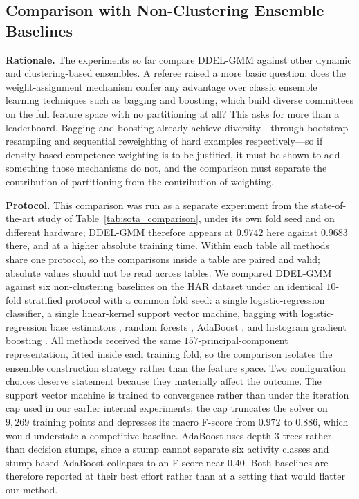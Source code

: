 \documentclass[lettersize,journal]{IEEEtran}
\begin{document}
		\subsection{Comparison with Non-Clustering Ensemble Baselines}
		
		\noindent \textbf{Rationale.} The experiments so far compare DDEL-GMM against other dynamic and clustering-based ensembles. A referee raised a more basic question: does the weight-assignment mechanism confer any advantage over classic ensemble learning techniques such as bagging and boosting, which build diverse committees on the full feature space with no partitioning at all? This asks for more than a leaderboard. Bagging and boosting already achieve diversity---through bootstrap resampling and sequential reweighting of hard examples respectively---so if density-based competence weighting is to be justified, it must be shown to add something those mechanisms do not, and the comparison must separate the contribution of partitioning from the contribution of weighting.
		
		\noindent \textbf{Protocol.} This comparison was run as a separate experiment from the state-of-the-art study of Table~\ref{tab:sota_comparison}, under its own fold seed and on different hardware; DDEL-GMM therefore appears at $0.9742$ here against $0.9683$ there, and at a higher absolute training time. Within each table all methods share one protocol, so the comparisons inside a table are paired and valid; absolute values should not be read across tables. We compared DDEL-GMM against six non-clustering baselines on the HAR dataset under an identical $10$-fold stratified protocol with a common fold seed: a single logistic-regression classifier, a single linear-kernel support vector machine, bagging with logistic-regression base estimators \cite{breiman_bagging_1996}, random forests \cite{breiman_random_2001}, AdaBoost \cite{freund_decision-theoretic_1997}, and histogram gradient boosting \cite{friedman_greedy_2001}. All methods received the same $157$-principal-component representation, fitted inside each training fold, so the comparison isolates the ensemble construction strategy rather than the feature space. Two configuration choices deserve statement because they materially affect the outcome. The support vector machine is trained to convergence rather than under the iteration cap used in our earlier internal experiments; the cap truncates the solver on $9{,}269$ training points and depresses its macro F-score from $0.972$ to $0.886$, which would understate a competitive baseline. AdaBoost uses depth-$3$ trees rather than decision stumps, since a stump cannot separate six activity classes and stump-based AdaBoost collapses to an F-score near $0.40$. Both baselines are therefore reported at their best effort rather than at a setting that would flatter our method.
\end{document}
